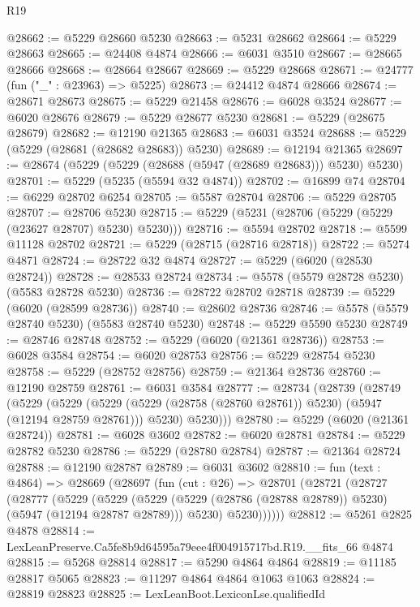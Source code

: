 \begin{lexlean}{R19}
\begin{coremodule}
@28662 := @5229 @28660 @5230
@28663 := @5231 @28662
@28664 := @5229 @28663
@28665 := @24408 @4874
@28666 := @6031 @3510
@28667 := @28665 @28666
@28668 := @28664 @28667
@28669 := @5229 @28668
@28671 := @24777 (fun ("_" : @23963) => @5225)
@28673 := @24412 @4874 @28666
@28674 := @28671 @28673
@28675 := @5229 @21458
@28676 := @6028 @3524
@28677 := @6020 @28676
@28679 := @5229 @28677 @5230
@28681 := @5229 (@28675 @28679)
@28682 := @12190 @21365
@28683 := @6031 @3524
@28688 := @5229 (@5229 (@28681 (@28682 @28683)) @5230)
@28689 := @12194 @21365
@28697 := @28674 (@5229 (@5229 (@28688 (@5947 (@28689 @28683))) @5230) @5230)
@28701 := @5229 (@5235 (@5594 @32 @4874))
@28702 := @16899 @74
@28704 := @6229 @28702 @6254
@28705 := @5587 @28704
@28706 := @5229 @28705
@28707 := @28706 @5230
@28715 := @5229 (@5231 (@28706 (@5229 (@5229 (@23627 @28707) @5230) @5230)))
@28716 := @5594 @28702
@28718 := @5599 @11128 @28702
@28721 := @5229 (@28715 (@28716 @28718))
@28722 := @5274 @4871
@28724 := @28722 @32 @4874
@28727 := @5229 (@6020 (@28530 @28724))
@28728 := @28533 @28724
@28734 := @5578 (@5579 @28728 @5230) (@5583 @28728 @5230)
@28736 := @28722 @28702 @28718
@28739 := @5229 (@6020 (@28599 @28736))
@28740 := @28602 @28736
@28746 := @5578 (@5579 @28740 @5230) (@5583 @28740 @5230)
@28748 := @5229 @5590 @5230
@28749 := @28746 @28748
@28752 := @5229 (@6020 (@21361 @28736))
@28753 := @6028 @3584
@28754 := @6020 @28753
@28756 := @5229 @28754 @5230
@28758 := @5229 (@28752 @28756)
@28759 := @21364 @28736
@28760 := @12190 @28759
@28761 := @6031 @3584
@28777 := @28734
    (@28739
      (@28749
        (@5229
          (@5229
            (@5229 (@5229 (@28758 (@28760 @28761)) @5230) (@5947 (@12194 @28759 @28761)))
            @5230)
          @5230)))
@28780 := @5229 (@6020 (@21361 @28724))
@28781 := @6028 @3602
@28782 := @6020 @28781
@28784 := @5229 @28782 @5230
@28786 := @5229 (@28780 @28784)
@28787 := @21364 @28724
@28788 := @12190 @28787
@28789 := @6031 @3602
@28810 := fun (text : @4864) =>
  @28669
    (@28697
      (fun (cut : @26) =>
      @28701
        (@28721
          (@28727
            (@28777
              (@5229
                (@5229
                  (@5229 (@5229 (@28786 (@28788 @28789)) @5230) (@5947 (@12194 @28787 @28789)))
                  @5230)
                @5230))))))
@28812 := @5261 @2825 @4878
@28814 := LexLeanPreserve.Ca5fe8b9d64595a79eee4f004915717bd.R19.__fits_66 @4874
@28815 := @5268 @28814
@28817 := @5290 @4864 @4864
@28819 := @11185 @28817 @5065
@28823 := @11297 @4864 @4864 @1063 @1063
@28824 := @28819 @28823
@28825 := LexLeanBoot.LexiconLse.qualifiedId

\end{coremodule}
\end{lexlean}
